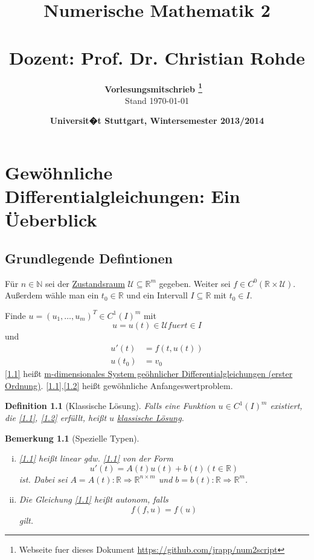 \documentclass[11pt]{book}
\title{\fontsize{35pt}{55pt}\selectfont\color{dblue} Numerische Mathematik 2 \\ \ \\ \Large \textbf{Dozent: } Prof. Dr. Christian Rohde}
\author{\color{dkgray}\textbf{Vorlesungsmitschrieb \footnote{Webseite fuer dieses
  Dokument \url{https://github.com/jrapp/num2script}}} \ \\ \small{\color{dkgray}Stand \today}}
\date{\Large\color{dkgray}\textbf{Universit�t Stuttgart, Wintersemester 2013/2014}}
\newcommand{\myTag}[2][]{\tag{#2}\label{#1#2}}
\theoremstyle{break}
\theoremstyle{myStyle}
\newcounter{myCounter}[chapter]
\newtheorem{Def}[myCounter]{Definition}
\newtheorem{Bem}[myCounter]{Bemerkung}
\begin{document}
\maketitle
\setcounter{tocdepth}{1}
\tableofcontents

\chapter{Gew\"ohnliche Differentialgleichungen: Ein \"Ueberblick}

\section{Grundlegende Defintionen}

F\"ur \( n \in \mathbb{N} \) sei der \uline{Zustandsraum} \( \mathcal{U} \subseteq
\mathbb{R}^m \) gegeben. Weiter sei \( f \in C^0(\mathbb{R} \times \mathcal{U})
\). Au\ss erdem w\"ahle man ein \( t_0 \in \mathbb{R} \) und ein Intervall \( I
\subseteq \mathbb{R} \) mit \( t_0 \in I \). 

Finde \( u = (u_1,\dotsc,u_m)^T \in C^1(I)^m \) mit \[ u = u(t) \in \mathcal{U} fuer t \in I \] und
\begin{align*}
  u'(t) &=f(t,u(t)) \myTag{1.1} \\
  u(t_0) &= v_0 \myTag{1.2}
\end{align*}
\eqref{1.1} hei\ss t \uline{m-dimensionales System ge\"ohnlicher Differentialgleichungen (erster Ordnung)}.
\eqref{1.1},\eqref{1.2} hei\ss t gew\"ohnliche Anfangeswertproblem.

\begin{Def}[Klassische L\"osung]

  Falls eine Funktion \( u \in C^1(I)^m \) existiert, die \eqref{1.1}, \eqref{1.2} erf\"ullt,
hei\ss t \( u \) \uline{klassische L\"osung}.

\end{Def}

\begin{Bem}[Spezielle Typen]
  \begin{enumerate}[(i)]
    \item \eqref{1.1} hei\ss t linear gdw. \eqref{1.1} von der Form \[ u'(t) = A(t) u(t) + b(t) (t \in \mathbb{R}) \] ist. Dabei sei \( A = A(t) : \mathbb{R} \Rightarrow \mathbb{R}^{n \times m} \) und \( b = b(t): \mathbb{R} \Rightarrow \mathbb{R}^m \).
    \item Die Gleichung \eqref{1.1} hei\ss t autonom, falls \[ f(f,u) = f(u) \] gilt.
  \end{enumerate}

\end{Bem}
\end{document}
